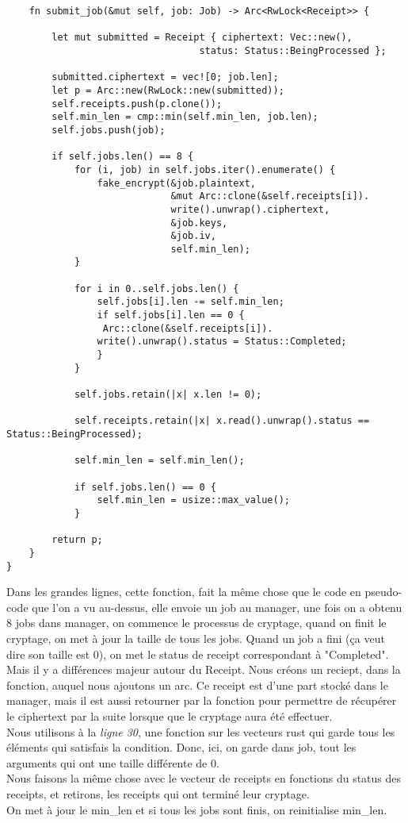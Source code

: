 \documentclass{article}
\begin{document}
\begin{lstlisting}
    fn submit_job(&mut self, job: Job) -> Arc<RwLock<Receipt>> {

        let mut submitted = Receipt { ciphertext: Vec::new(),
                                  status: Status::BeingProcessed };

        submitted.ciphertext = vec![0; job.len];
        let p = Arc::new(RwLock::new(submitted));
        self.receipts.push(p.clone());
        self.min_len = cmp::min(self.min_len, job.len);
        self.jobs.push(job);

        if self.jobs.len() == 8 {
            for (i, job) in self.jobs.iter().enumerate() {
                fake_encrypt(&job.plaintext,
                             &mut Arc::clone(&self.receipts[i]).
                             write().unwrap().ciphertext,
                             &job.keys,
                             &job.iv,
                             self.min_len);
            }

            for i in 0..self.jobs.len() {
                self.jobs[i].len -= self.min_len;
                if self.jobs[i].len == 0 {
                 Arc::clone(&self.receipts[i]).
                write().unwrap().status = Status::Completed;
                }
            }

            self.jobs.retain(|x| x.len != 0);
            
            self.receipts.retain(|x| x.read().unwrap().status == Status::BeingProcessed);

            self.min_len = self.min_len();
            
            if self.jobs.len() == 0 {
                self.min_len = usize::max_value();
            }

        return p;
    }
}
\end{lstlisting}

Dans les grandes lignes, cette fonction, fait la même chose que le code en pseudo-code que l'on a vu au-dessus, elle envoie un job au manager, une fois on a obtenu 8 jobs dans manager, on commence le processus de cryptage, quand on finit le cryptage, on met à jour la taille de tous les jobs. Quand un job a fini (ça veut dire son taille est 0), on met le status de receipt correspondant à "Completed".\\
Mais il y a différences majeur autour du Receipt. Nous créons un reciept, dans la fonction, auquel nous ajoutons un arc. Ce receipt est d'une part stocké dans le manager, mais il est aussi retourner par la fonction pour permettre de récupérer le ciphertext par la suite lorsque que le cryptage aura été effectuer. \\
Nous utilisons à la \textit{ligne 30}, une fonction sur les vecteurs rust qui garde tous les éléments qui satisfais  la condition. Donc, ici, on garde dans job, tout les arguments qui ont une taille différente de 0. \\
Nous faisons la même chose avec le vecteur de receipts en fonctions du status des receipts, et retirons, les receipts qui ont terminé leur cryptage. \\
On met à jour le min\_len et si tous les jobs sont finis, on reinitialise min\_len.
\end{document}
